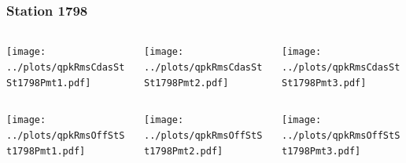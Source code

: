 \documentclass[aspectratio=169]{beamer}
\begin{document}
\begin{frame} 
  \frametitle{Station 1798}
  \begin{center}
    \begin{columns}
      \begin{column}{0.33\textwidth}
        \texttt{[image: ../plots/qpkRmsCdasStSt1798Pmt1.pdf]}
      \end{column}
      \begin{column}{0.33\textwidth}
        \texttt{[image: ../plots/qpkRmsCdasStSt1798Pmt2.pdf]}
      \end{column}
      \begin{column}{0.33\textwidth}
        \texttt{[image: ../plots/qpkRmsCdasStSt1798Pmt3.pdf]}
      \end{column}
    \end{columns}
  \end{center}

  \begin{center}
    \begin{columns}
      \begin{column}{0.33\textwidth}
        \texttt{[image: ../plots/qpkRmsOffStSt1798Pmt1.pdf]}
      \end{column}
      \begin{column}{0.33\textwidth}
        \texttt{[image: ../plots/qpkRmsOffStSt1798Pmt2.pdf]}
      \end{column}
      \begin{column}{0.33\textwidth}
        \texttt{[image: ../plots/qpkRmsOffStSt1798Pmt3.pdf]}
      \end{column}
    \end{columns}
  \end{center}
\end{frame}
\end{document}
